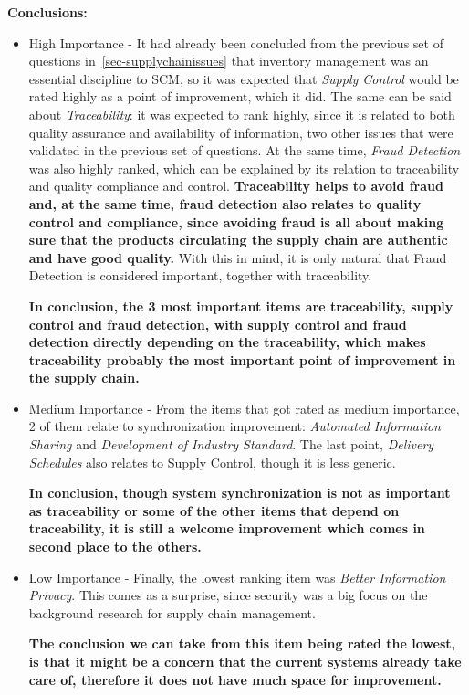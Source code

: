 \par \textbf{Conclusions: }
\begin{itemize}

\item High Importance - It had already been concluded from the previous set of questions in~\ref{sec-supplychainissues} that inventory management was an essential discipline to SCM, so it was expected that \textit{Supply Control} would be rated highly as a point of improvement, which it did. The same can be said about \textit{Traceability}: it was expected to rank highly, since it is related to both quality assurance and availability of information, two other issues that were validated in the previous set of questions. At the same time, \textit{Fraud Detection} was also highly ranked, which can be explained by its relation to traceability and quality compliance and control. \textbf{Traceability helps to avoid fraud and, at the same time, fraud detection also relates to quality control and compliance, since avoiding fraud is all about making sure that the products circulating the supply chain are authentic and have good quality.} With this in mind, it is only natural that Fraud Detection is considered important, together with traceability.

\textbf{In conclusion, the 3 most important items are traceability, supply control and fraud detection, with supply control and fraud detection directly depending on the traceability, which makes traceability probably the most important point of improvement in the supply chain.}

\item Medium Importance - From the items that got rated as medium importance, 2 of them relate to synchronization improvement: \textit{Automated Information Sharing} and \textit{Development of Industry Standard}. The last point, \textit{Delivery Schedules} also relates to Supply Control, though it is less generic.

\textbf{In conclusion, though system synchronization is not as important as traceability or some of the other items that depend on traceability, it is still a welcome improvement which comes in second place to the others.}


\item Low Importance - Finally, the lowest ranking item was \textit{Better Information Privacy}. This comes as a surprise, since security was a big focus on the background research for supply chain management. 

\textbf{The conclusion we can take from this item being rated the lowest, is that it might be a concern that the current systems already take care of, therefore it does not have much space for improvement.}
\end{itemize}


